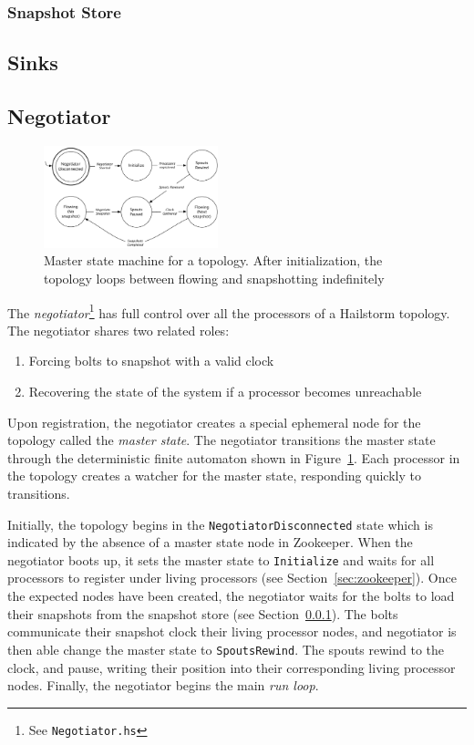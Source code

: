 \documentclass[10pt,nocopyrightspace]{sigplanconf}
\begin{document}
\subsubsection{Snapshot Store}
\label{sec:snapshot}

\subsection{Sinks}

\subsection{Negotiator}
\label{sec:negotiator}
\begin{figure}
  \includegraphics[width=0.45\textwidth]{images/master_state.pdf}
  \caption{Master state machine for a topology. After initialization, the
  topology loops between flowing and snapshotting
  indefinitely}\label{fig:masterstate}
\end{figure}

The \textit{negotiator}\footnote{See \texttt{Negotiator.hs}} has full control
over all the processors of a Hailstorm topology. The negotiator shares
two related roles:
\begin{enumerate}
  \item Forcing bolts to snapshot with a valid clock
  \item Recovering the state of the system if a processor
        becomes unreachable
\end{enumerate}

Upon registration, the negotiator creates a special ephemeral node for the
topology called the \textit{master state}. The negotiator transitions the master
state through the deterministic finite automaton shown in
Figure~\ref{fig:masterstate}. Each processor in the topology creates a
watcher for the master state, responding quickly to transitions.

Initially, the topology begins in the \texttt{NegotiatorDisconnected} state which
is indicated by the absence of a master state node in Zookeeper. When the
negotiator boots up, it sets the master state to \texttt{Initialize} and waits
for all processors to register under living processors (see
Section~\ref{sec:zookeeper}). Once the expected nodes have been created, the
negotiator waits for the bolts to load their snapshots from the snapshot store
(see Section~\ref{sec:snapshot}). The bolts communicate their snapshot clock
their living processor nodes, and negotiator is then able change the master state to
\texttt{SpoutsRewind}. The spouts rewind to the clock, and pause, writing their
position into their corresponding living processor nodes. Finally, the
negotiator begins the main \textit{run loop}.
\end{document}
